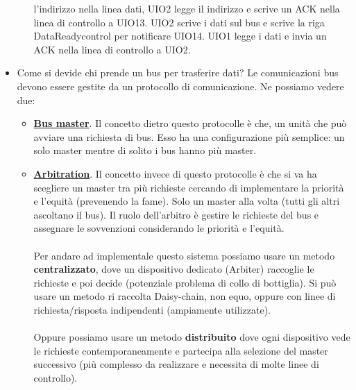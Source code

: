 \begin{itemize}
\begin{itemize}
        l'indirizzo nella linea dati, UIO2 legge il indirizzo e scrive un ACK nella linea di controllo a UIO13. UIO2 scrive i dati sul bus e scrive la riga DataReadycontrol per notificare UIO14. UIO1 legge i dati e invia un ACK nella linea di controllo a UIO2.
    \end{itemize}
    \item Come si devide chi prende un bus per trasferire dati? Le comunicazioni bus devono essere gestite da un protocollo di comunicazione. Ne possiamo vedere due:
    \begin{itemize}
        \item \underline{\textbf{Bus master}}. Il concetto dietro questo protocolle è che, un unità che può avviare una richiesta di bus. Esso ha una configurazione più semplice: un solo master mentre di solito i bus hanno più master.
        \item \underline{\textbf{Arbitration}}. Il concetto invece di questo protocolle è che si va ha scegliere un master tra più richieste cercando di implementare la priorità e l'equità (prevenendo la fame). Solo un master alla volta (tutti gli altri ascoltano il bus). Il ruolo dell'arbitro è gestire le richieste del bus e assegnare le sovvenzioni considerando le priorità e l'equità.\\\\
        Per andare ad implementale questo sistema possiamo usare un metodo \textbf{centralizzato}, dove un dispositivo dedicato (Arbiter) raccoglie le richieste e poi decide (potenziale problema di collo di bottiglia). Si può usare un metodo ri raccolta Daisy-chain, non equo, oppure con linee di richiesta/risposta indipendenti (ampiamente utilizzate).
        \\\\Oppure possiamo usare un metodo \textbf{distribuito} dove ogni dispositivo vede le richieste contemporaneamente e partecipa alla selezione del master successivo (più complesso da realizzare e necessita di molte linee di controllo).
    \end{itemize}
\end{itemize}


